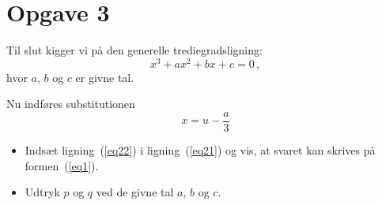 \documentclass[12pt,oneside,a4paper]{article}
\begin{document}
\section*{Opgave 3}
Til slut kigger vi på den generelle trediegradsligning:
\begin{equation}
    x^3 + ax^2 + bx + c = 0 \,,
    \label{eq21}
\end{equation}
hvor $a$, $b$ og $c$ er givne tal.

Nu indføres substitutionen
\begin{equation}
    x = u - \frac{a}{3}
    \label{eq22}
\end{equation}

\begin{itemize}
    \item Indsæt ligning~(\ref{eq22}) i ligning~(\ref{eq21}) og vis, at svaret
        kan skrives på formen~(\ref{eq1}).
    \item Udtryk $p$ og $q$ ved de givne tal $a$, $b$ og $c$.
\end{itemize}
\end{document}
